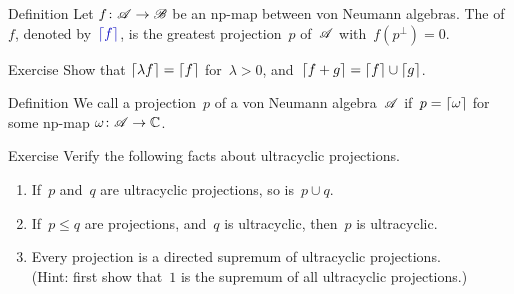 \documentclass[a]{subfiles}
\begin{document}
\begin{parsec}%
\begin{point}[carrier]{Definition}%
Let $f\colon\mathscr{A}\to\mathscr{B}$
be an np-map between von Neumann algebras.
The  of~$f$, denoted by~$\Define{\ceil{f}}$,
is the greatest projection~$p$
of~$\mathscr{A}$ with~$f(p^\perp)= 0 $.

\end{point}
\begin{point}{Exercise}%
Show that $\left\lceil\lambda f\right\rceil = \left\lceil f\right\rceil$ for~$\lambda>0$,
and~$\left\lceil f+g\right\rceil = \left\lceil f\right\rceil\cup \left\lceil g\right\rceil$.
\end{point}
\begin{point}{Definition}%
We call a projection~$p$ of a von Neumann algebra~$\mathscr{A}$
 if~$p=\left\lceil\omega\right\rceil$
for some np-map $\omega\colon \mathscr{A}\to\mathbb{C}$.
\end{point}
\begin{point}{Exercise}%
Verify the following facts about ultracyclic projections.
\begin{enumerate}
\item
If~$p$ and~$q$ are ultracyclic projections,
so is~$p\cup q$.
\item
If~$p \leq q$ are projections,
and~$q$ is ultracyclic,
then~$p$ is ultracyclic.

\item
Every projection is a directed supremum
of ultracyclic projections.\\
(Hint: first show that~$1$ is the supremum of all ultracyclic projections.)
\end{enumerate}
\end{point}
\end{parsec}%
\end{document}
